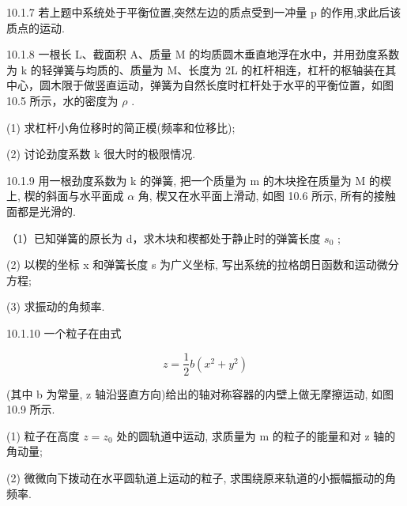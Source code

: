 \begin{problem}{10.1.7}
若上题中系统处于平衡位置,突然左边的质点受到一冲量 p 的作用,求此后该质点的运动.
\end{problem}
\clearpage


\begin{problem}{10.1.8}
一根长 L、截面积 A、质量 M 的均质圆木垂直地浮在水中，并用劲度系数为 k 的轻弹簧与均质的、质量为 M、长度为 2L 的杠杆相连，杠杆的枢轴装在其中心，圆木限于做竖直运动，弹簧为自然长度时杠杆处于水平的平衡位置，如图 10.5 所示，水的密度为 $\rho$ .

(1) 求杠杆小角位移时的简正模(频率和位移比);

(2) 讨论劲度系数 k 很大时的极限情况.
\begin{center}

\end{center}
\end{problem}
\clearpage


\begin{problem}{10.1.9}
用一根劲度系数为 k 的弹簧, 把一个质量为 m 的木块拴在质量为 M 的楔上, 楔的斜面与水平面成 $\alpha$ 角, 楔又在水平面上滑动, 如图 10.6 所示, 所有的接触面都是光滑的.

（1）已知弹簧的原长为 d，求木块和楔都处于静止时的弹簧长度 $s_{0}$ ;

(2) 以楔的坐标 x 和弹簧长度 s 为广义坐标, 写出系统的拉格朗日函数和运动微分方程;

(3) 求振动的角频率.
\begin{center}

\end{center}
\end{problem}
\clearpage


\begin{problem}{10.1.10}
一个粒子在由式

\[
z = \frac {1}{2} b (x ^ {2} + y ^ {2})
\]

(其中 b 为常量, z 轴沿竖直方向)给出的轴对称容器的内壁上做无摩擦运动, 如图 10.9 所示.

(1) 粒子在高度 $z = z_{0}$ 处的圆轨道中运动, 求质量为 m 的粒子的能量和对 z 轴的角动量;

(2) 微微向下拨动在水平圆轨道上运动的粒子, 求围绕原来轨道的小振幅振动的角频率.
\begin{center}

\end{center}
\begin{center}

\end{center}
\end{problem}
\clearpage


